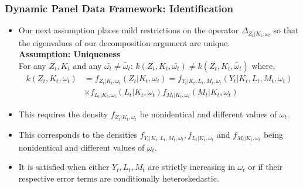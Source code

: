\documentclass{beamer}
\begin{document}
\begin{frame}
\frametitle{Dynamic Panel Data Framework: Identification}
\begin{itemize}
\item Our next assumption places mild restrictions on the operator $\Delta_{Z_{t}|K_{t}, \omega_{t}}$ so that the eigenvalues of our decomposition argument are unique.\\
\textbf{Assumption: Uniqueness}\\
For any $Z_{t}, K_{t}$ and any $\bar{\omega_{t}}\neq \tilde{\omega_{t}}$:
 $k(Z_{t}, K_{t}, \bar{\omega_{t}})\neq k(Z_{t}, K_{t}, \tilde{\omega_{t}})$ where,\\
    \begin{equation}
    \begin{split}
    k(Z_{t}, K_{t}, \omega_{t})&=f_{Z_{t}|K_{t}, \omega_{t}}(Z_{t}|K_{t}, \omega_{t})=f_{Y_{t}|K_{t}, L_{t}, M_{t}, \omega_{t}}(Y_{t}|K_{t}, L_{t}, M_{t}, \omega_{t})\\
    &\times f_{L_{t}|K_{t}, \omega_{t}}(L_{t}|K_{t}, \omega_{t})f_{M_{t}|K_{t}, \omega_{t}}(M_{t}|K_{t}, \omega_{t})
    \end{split}
    \end{equation}
\item This requires the density $f_{Z_{t}|K_{t}, \omega_{t}}$ be nonidentical and different values of $\omega_{t}$.
\item This corresponds to the densities $f_{Y_{t}|K_{t}, L_{t}, M_{t}, \omega_{t}}, f_{L_{t}|K_{t}, \omega_{t}}$ and $f_{M_{t}|K_{t}, \omega_{t}}$ being nonidentical and different values of $\omega_{t}$. 
\item It is satisfied when either $Y_{t}, L_{t}, M_{t}$ are strictly increasing in $\omega_{t}$ or if their respective error terms are conditionally heteroskedastic.
\end{itemize}
\end{frame}

\end{document}
